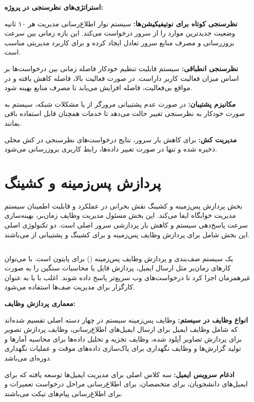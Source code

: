 \documentclass[12pt,a4paper]{report}
\begin{document}
	\textbf{استراتژی‌های نظرسنجی در پروژه:}
	
	\textbf{نظرسنجی کوتاه برای نوتیفیکیشن‌ها:} سیستم نوار اطلاع‌رسانی مدیریت هر ۱۰ ثانیه وضعیت جدیدترین موارد را از سرور درخواست می‌کند. این بازه زمانی بین سرعت بروزرسانی و مصرف منابع سرور تعادل ایجاد کرده و برای کاربرد مدیریتی مناسب است.
	
	\textbf{نظرسنجی انطباقی:} سیستم قابلیت تنظیم خودکار فاصله زمانی بین درخواست‌ها بر اساس میزان فعالیت کاربر داراست. در صورت فعالیت بالا، فاصله کاهش یافته و در مواقع بی‌فعالیت، فاصله افزایش می‌یابد تا مصرف منابع بهینه شود.
	
	\textbf{مکانیزم پشتیبان:} در صورت عدم پشتیبانی مرورگر از  یا مشکلات شبکه، سیستم به صورت خودکار به نظرسنجی تغییر حالت می‌دهد تا خدمات همچنان قابل استفاده باقی بمانند.
	
	\textbf{مدیریت کش:} برای کاهش بار سرور، نتایج درخواست‌های نظرسنجی در کش محلی ذخیره شده و تنها در صورت تغییر داده‌ها، رابط کاربری بروزرسانی می‌شود.
	\section{پردازش پس‌زمینه و کشینگ}
	بخش پردازش پس‌زمینه و کشینگ نقش بحرانی در عملکرد و قابلیت اطمینان سیستم مدیریت خوابگاه ایفا می‌کند. این بخش مسئول مدیریت وظایف زمان‌بر، بهینه‌سازی سرعت پاسخ‌دهی سیستم و کاهش بار پردازشی سرور اصلی است. دو تکنولوژی اصلی این بخش شامل  برای پردازش وظایف پس‌زمینه و  برای کشینگ و پشتیبانی از  می‌باشند.
	
	\subsection{}
	 یک سیستم صف‌بندی و پردازش وظایف پس‌زمینه () برای پایتون است. با  می‌توان کارهای زمان‌بر مثل ارسال ایمیل، پردازش فایل یا محاسبات سنگین را به صورت غیرهمزمان اجرا کرد تا درخواست‌های وب سریع‌تر پاسخ داده شوند. اغلب با  یا  به عنوان کارگزار برای مدیریت صف‌ها استفاده می‌شود.
	
	\textbf{معماری پردازش وظایف:}
	
	\textbf{انواع وظایف در سیستم:} وظایف پس‌زمینه سیستم در چهار دسته اصلی تقسیم شده‌اند که شامل وظایف ایمیل برای ارسال ایمیل‌های اطلاع‌رسانی، وظایف پردازش تصویر برای پردازش تصاویر آپلود شده، وظایف تجزیه و تحلیل داده‌ها برای محاسبه آمارها و تولید گزارش‌ها و وظایف نگهداری برای پاک‌سازی داده‌های موقت و عملیات نگهداری دوره‌ای می‌باشد.
	
	\textbf{ادغام سرویس ایمیل:} سه کلاس اصلی برای مدیریت ایمیل‌ها توسعه یافته که  برای ایمیل‌های دانشجویان،  برای متخصصان،  برای اطلاع‌رسانی مراحل درخواست تعمیرات و  برای اطلاع‌رسانی پیام‌های تیکت می‌باشند.
	
\end{document}
